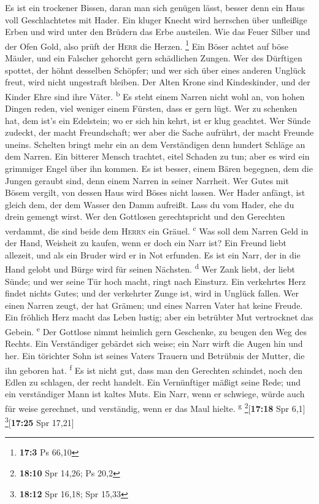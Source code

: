  Es ist ein trockener Bissen, daran man sich genügen
lässt, besser denn ein Haus voll Geschlachtetes mit Hader.
 Ein kluger Knecht wird herrschen über unfleißige Erben
und wird unter den Brüdern das Erbe austeilen.  Wie das
Feuer Silber und der Ofen Gold, also prüft der \textsc{Herr} die Herzen.
\footnote{\textbf{17:3} Ps 66,10}  Ein Böser achtet auf
böse Mäuler, und ein Falscher gehorcht gern schädlichen Zungen.
 Wer des Dürftigen spottet, der höhnt desselben Schöpfer;
und wer sich über eines anderen Unglück freut, wird nicht ungestraft
bleiben.  Der Alten Krone sind Kindeskinder, und der
Kinder Ehre sind ihre Väter. \textsuperscript{b}  Es steht
einem Narren nicht wohl an, von hohen Dingen reden, viel weniger einem
Fürsten, dass er gern lügt.  Wer zu schenken hat, dem
ist's ein Edelstein; wo er sich hin kehrt, ist er klug geachtet.
 Wer Sünde zudeckt, der macht Freundschaft; wer aber die
Sache aufrührt, der macht Freunde uneins.  Schelten
bringt mehr ein an dem Verständigen denn hundert Schläge an dem Narren.
 Ein bitterer Mensch trachtet, eitel Schaden zu tun; aber
es wird ein grimmiger Engel über ihn kommen.  Es ist
besser, einem Bären begegnen, dem die Jungen geraubt sind, denn einem
Narren in seiner Narrheit.  Wer Gutes mit Bösem vergilt,
von dessen Haus wird Böses nicht lassen.  Wer Hader
anfängt, ist gleich dem, der dem Wasser den Damm aufreißt. Lass du vom
Hader, ehe du drein gemengt wirst.  Wer den Gottlosen
gerechtspricht und den Gerechten verdammt, die sind beide dem
\textsc{Herrn} ein Gräuel. \textsuperscript{c}  Was soll
dem Narren Geld in der Hand, Weisheit zu kaufen, wenn er doch ein Narr
ist?  Ein Freund liebt allezeit, und als ein Bruder wird
er in Not erfunden.  Es ist ein Narr, der in die Hand
gelobt und Bürge wird für seinen Nächsten. \textsuperscript{d}
 Wer Zank liebt, der liebt Sünde; und wer seine Tür hoch
macht, ringt nach Einsturz.  Ein verkehrtes Herz findet
nichts Gutes; und der verkehrter Zunge ist, wird in Unglück fallen.
 Wer einen Narren zeugt, der hat Grämen; und eines Narren
Vater hat keine Freude.  Ein fröhlich Herz macht das
Leben lustig; aber ein betrübter Mut vertrocknet das Gebein.
\textsuperscript{e}  Der Gottlose nimmt heimlich gern
Geschenke, zu beugen den Weg des Rechts.  Ein
Verständiger gebärdet sich weise; ein Narr wirft die Augen hin und her.
 Ein törichter Sohn ist seines Vaters Trauern und
Betrübnis der Mutter, die ihn geboren hat. \textsuperscript{f}
 Es ist nicht gut, dass man den Gerechten schindet, noch
den Edlen zu schlagen, der recht handelt.  Ein
Vernünftiger mäßigt seine Rede; und ein verständiger Mann ist kaltes
Muts.  Ein Narr, wenn er schwiege, würde auch für weise
gerechnet, und verständig, wenn er das Maul hielte. \textsuperscript{g}
\footnote{\textbf{18:10} Spr 14,26; Ps 20,2}{[}\textbf{17:18} Spr 6,1{]}
\footnote{\textbf{18:12} Spr 16,18; Spr 15,33}{[}\textbf{17:25} Spr
17,21{]}

